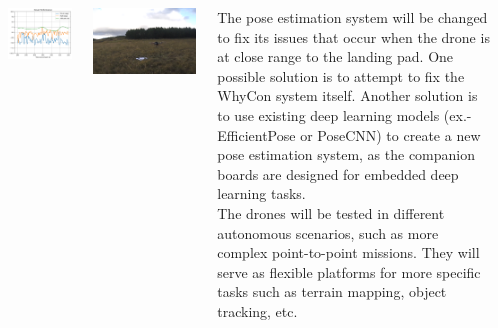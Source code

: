 \documentclass[a1paper, landscape, blockverticalspace=1cm, 14pt]{tikzposter}
\begin{document}
\begin{columns}
{        \begin{tikzfigure}
            \includegraphics[width=0.45\linewidth]{stability.png}
            \label{fig:stability}
        \end{tikzfigure}

        \begin{tikzfigure}
            \includegraphics[width=0.6\linewidth]{drone_in_flight.png}
            \label{fig:drone_in_flight}
        \end{tikzfigure}
    }
    
    {
        \normalsize
        The pose estimation system will be changed to fix its issues that occur when the drone is at close range to the landing pad.
        One possible solution is to attempt to fix the WhyCon system itself.
        Another solution is to use existing deep learning models (ex.- EfficientPose or PoseCNN) to create a new pose estimation system, as the companion boards are designed for embedded deep learning tasks.\\

        The drones will be tested in different autonomous scenarios, such as more complex point-to-point missions.
        They will serve as flexible platforms for more specific tasks such as terrain mapping, object tracking, etc.
    }

    {
        \printbibliography[heading=none]
    }

\end{columns}
\end{document}

